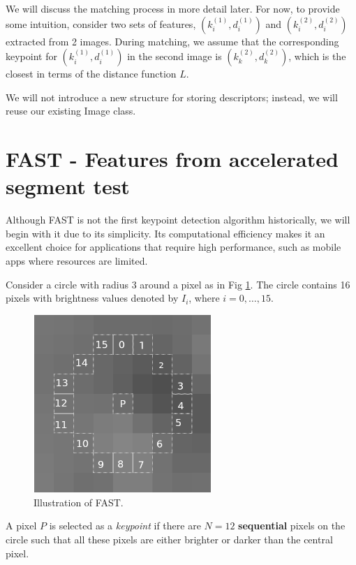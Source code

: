 \documentclass[11pt]{book}
\begin{document}
We will discuss the matching process in more detail later. For now, to provide some intuition, consider two sets of features, $(k^{(1)}_i, d^{(1)}_i)$ and $(k^{(2)}_i, d^{(2)}_i)$ extracted from 2 images. During matching, we assume that the corresponding keypoint for $(k^{(1)}_i, d^{(1)}_i)$  in the second image is $(k^{(2)}_k, d^{(2)}_k)$, which is the closest in terms of the distance function $L$.

We will not introduce a new structure for storing descriptors; instead, we will reuse our existing Image class.

 \section{FAST - Features from accelerated segment test }
 
 Although FAST is not the first keypoint detection algorithm historically, we will begin with it due to its simplicity. Its computational efficiency makes it an excellent choice for applications that require high performance, such as mobile apps where resources are limited.
 
 Consider a circle with radius 3 around a pixel as in Fig \ref{fig:fast}. The circle contains 16 pixels with brightness values denoted by $I_i$, where $i = 0,\ldots, 15$. 

 \begin{figure}[h]
\centering
\includegraphics[width=0.6\textwidth]{images/fast.png}
\caption{Illustration of FAST.}
\label{fig:fast}
\end{figure}
 
 
A pixel $𝑃$ is selected as a \textit{keypoint} if there are 
$𝑁=12$ \textbf{sequential} pixels on the circle such that all these pixels are either brighter or darker than the central pixel.
 
\end{document}
